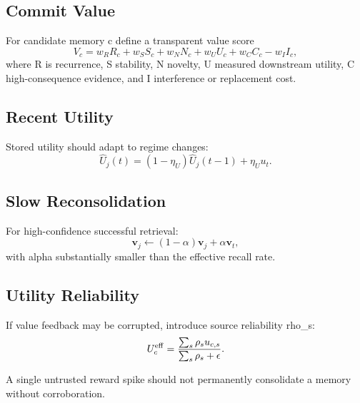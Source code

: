 

\subsection{Commit Value}

For candidate memory c define a transparent value score
\[
V_c =
w_R R_c +
w_S S_c +
w_N N_c +
w_U U_c +
w_C C_c -
w_I I_c ,
\]
where R is recurrence, S stability, N novelty, U measured downstream utility,
C high-consequence evidence, and I interference or replacement cost.

\subsection{Recent Utility}

Stored utility should adapt to regime changes:
\[
\hat U_j(t)
=
(1-\eta_U)\hat U_j(t-1)
+
\eta_U u_t .
\]

\subsection{Slow Reconsolidation}

For high-confidence successful retrieval:
\[
\mathbf v_j
\leftarrow
(1-\alpha)\mathbf v_j
+
\alpha\mathbf v_t ,
\]
with alpha substantially smaller than the effective recall rate.

\subsection{Utility Reliability}

If value feedback may be corrupted, introduce source reliability rho_s:
\[
U_c^{\rm eff}
=
\frac{\sum_s \rho_s u_{c,s}}
{\sum_s \rho_s+\epsilon}.
\]

A single untrusted reward spike should not permanently consolidate a memory without
corroboration.

